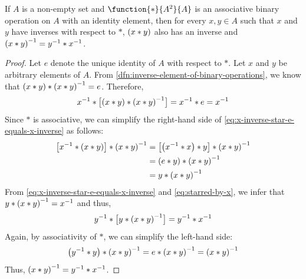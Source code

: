 \begin{thm}
    \label{thm:inverse-of-x-star-y}
    If \( A \) is a non-empty set and \( \function{\ast}{A^{2}}{A} \) is an associative binary operation on \( A \) with an identity element,
    then for every \( x,y \in A \) such that \( x \) and \( y \) have inverses with respect to \( \ast \), \( \mleft( x \ast y \mright) \)
    also has an inverse and \( \mleft( x \ast y \mright)^{-1} = y^{-1} \ast x^{-1} \).
\end{thm}

\begin{proof}
    Let \( e \) denote the unique identity of \( A \) with respect to \( \ast \).
    Let \( x \) and \( y \) be arbitrary elements of \( A \). From \cref{dfn:inverse-element-of-binary-operations}, we know that
    \( \mleft( x \ast y \mright) \ast \mleft( x \ast y \mright)^{-1} = e \). Therefore,
    \begin{equation}
        \label{eq:x-inverse-star-e-equals-x-inverse}
        x^{-1} \ast \big[ \mleft( x \ast y \mright) \ast \mleft( x \ast y \mright)^{-1} \big] = x^{-1} \ast e = x^{-1}
    \end{equation}
    Since \( \ast \) is associative, we can simplify the right-hand side of \eqref{eq:x-inverse-star-e-equals-x-inverse} as follows:
    \begin{align}
        \big[ x^{-1} \ast \mleft( x \ast y \mright) \big] \ast \mleft( x \ast y \mright)^{-1}
            &= \big[ \mleft( x^{-1} \ast x \mright) \ast y \big] \ast \mleft( x \ast y \mright)^{-1} \notag \\
            &= \mleft( e \ast y \mright) \ast \mleft( x \ast y \mright)^{-1} \notag \\
            &= y \ast \mleft( x \ast y \mright)^{-1} \label{eq:starred-by-x}
    \end{align}
    From \eqref{eq:x-inverse-star-e-equals-x-inverse} and \eqref{eq:starred-by-x}, we infer that
    \( y \ast \mleft( x \ast y \mright)^{-1} = x^{-1} \) and thus,
    \begin{equation*}
        y^{-1} \ast \big[ y \ast \mleft( x \ast y \mright)^{-1} \big] = y^{-1} \ast x^{-1}
    \end{equation*}
    Again, by associativity of \( \ast \), we can simplify the left-hand side:
    \begin{equation*}
        \mleft( y^{-1} \ast y \mright) \ast \mleft( x \ast y \mright)^{-1} = e \ast \mleft( x \ast y \mright)^{-1}
        = \mleft( x \ast y \mright)^{-1}
    \end{equation*}
    Thus, \( \mleft( x \ast y \mright)^{-1} = y^{-1} \ast x^{-1} \).
\end{proof}

